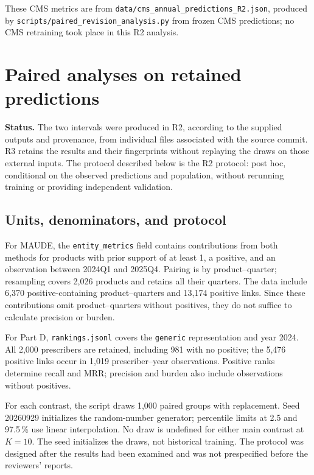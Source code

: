 \documentclass[10pt,a4paper]{article}
\newcommand{\src}[1]{{\small\nolinkurl{#1}}}
\begin{document}
These CMS metrics are from \src{data/cms_annual_predictions_R2.json}, produced by \src{scripts/paired_revision_analysis.py} from frozen CMS predictions; no CMS retraining took place in this R2 analysis.

\section{Paired analyses on retained predictions}
\label{supp:bootstrap}
\textbf{Status.} The two intervals were produced in R2, according to the supplied outputs and provenance, from individual files associated with the source commit. R3 retains the results and their fingerprints without replaying the draws on those external inputs. The protocol described below is the R2 protocol: post hoc, conditional on the observed predictions and population, without rerunning training or providing independent validation.

\subsection{Units, denominators, and protocol}
For MAUDE, the \src{entity_metrics} field contains contributions from both methods for products with prior support of at least 1, a positive, and an observation between 2024Q1 and 2025Q4. Pairing is by product--quarter; resampling covers 2,026 products and retains all their quarters. The data include 6,370 positive-containing product--quarters and 13,174 positive links. Since these contributions omit product--quarters without positives, they do not suffice to calculate precision or burden.

For Part D, \src{rankings.jsonl} covers the \src{generic} representation and year 2024. All 2,000 prescribers are retained, including 981 with no positive; the 5,476 positive links occur in 1,019 prescriber--year observations. Positive ranks determine recall and MRR; precision and burden also include observations without positives.

For each contrast, the script draws 1,000 paired groups with replacement. Seed 20260929 initializes the random-number generator; percentile limits at 2.5 and 97.5\,\% use linear interpolation. No draw is undefined for either main contrast at $K=10$. The seed initializes the draws, not historical training. The protocol was designed after the results had been examined and was not prespecified before the reviewers' reports.
\end{document}

